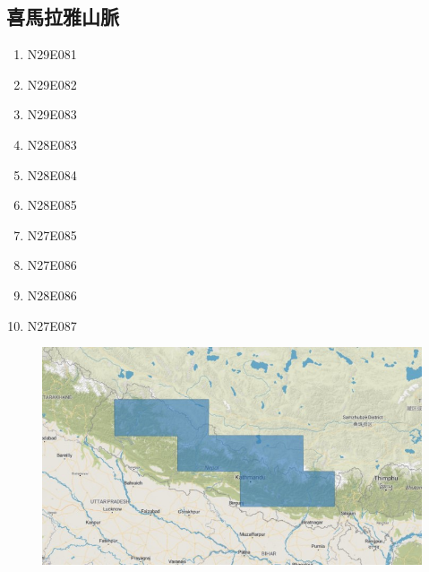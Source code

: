 \documentclass[a4paper, 12pt]{article}
\begin{document}
\begin{appendices}
    \subsection{喜馬拉雅山脈}
    \begin{multicols}{4}
        \begin{enumerate}
            \item N29E081
            \item N29E082
            \item N29E083
            \item N28E083
            \item N28E084
            \item N28E085
            \item N27E085
            \item N27E086
            \item N28E086
            \item N27E087
        \end{enumerate}
    \end{multicols}
    \begin{figure}[H]
        \centering
        \includegraphics[width=0.8\linewidth]{fig/a2.jpg}
    \end{figure}

\end{appendices}
\end{document}
